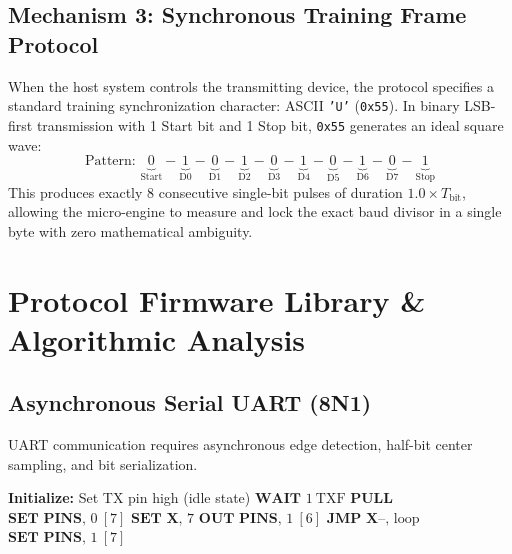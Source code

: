 \documentclass[11pt,a4paper]{article}
\begin{document}
\subsection{Mechanism 3: Synchronous Training Frame Protocol}
When the host system controls the transmitting device, the protocol specifies a standard training synchronization character: ASCII \texttt{'U'} (\texttt{0x55}). In binary LSB-first transmission with 1 Start bit and 1 Stop bit, \texttt{0x55} generates an ideal square wave:
\begin{equation}
    \text{Pattern: } \underbrace{0}_{\text{Start}} - \underbrace{1}_{\text{D0}} - \underbrace{0}_{\text{D1}} - \underbrace{1}_{\text{D2}} - \underbrace{0}_{\text{D3}} - \underbrace{1}_{\text{D4}} - \underbrace{0}_{\text{D5}} - \underbrace{1}_{\text{D6}} - \underbrace{0}_{\text{D7}} - \underbrace{1}_{\text{Stop}}
\end{equation}
This produces exactly 8 consecutive single-bit pulses of duration $1.0 \times T_{\text{bit}}$, allowing the micro-engine to measure and lock the exact baud divisor in a single byte with zero mathematical ambiguity.
\section{Protocol Firmware Library \& Algorithmic Analysis}

\subsection{Asynchronous Serial UART (8N1)}
UART communication requires asynchronous edge detection, half-bit center sampling, and bit serialization.

\begin{algorithm}[H]
\caption{UART Transmitter (8N1)}
\begin{algorithmic}[1]
\STATE \textbf{Initialize:} Set TX pin high (idle state)
\LOOP
    \STATE $\textbf{WAIT } 1\ \text{TXF}$ 
    \STATE $\textbf{PULL}$ 
    \STATE $\textbf{SET PINS, } 0\ [7]$ 
    \STATE $\textbf{SET X, } 7$ 
    \REPEAT
        \STATE $\textbf{OUT PINS, } 1\ [6]$ 
        \STATE $\textbf{JMP X--, } \text{loop}$
    \STATE $\textbf{SET PINS, } 1\ [7]$ 
\ENDLOOP
\end{algorithmic}
\end{algorithm}
\end{document}
